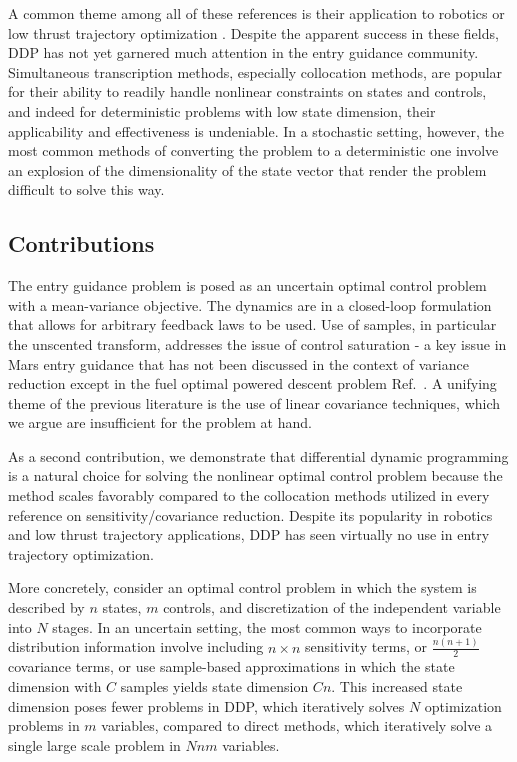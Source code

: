 \documentclass[letterpaper, paper,11pt]{AAS}
\begin{document}
A common theme among all of these references is their application to robotics \cite{iLQG, DDP_Stochastic} or low thrust trajectory optimization \cite{HDDP1,HDDP2,ozaki_UT,ozaki2020tube}. Despite the apparent success in these fields, DDP has not yet garnered much attention in the entry guidance community. Simultaneous transcription methods, especially collocation methods, are popular for their ability to readily handle nonlinear constraints on states and controls, and indeed for deterministic problems with low state dimension, their applicability and effectiveness is undeniable. In a stochastic setting, however, the most common methods of converting the problem to a deterministic one involve an explosion of the dimensionality of the state vector that render the problem difficult to solve this way.

\subsection{Contributions}
The entry guidance problem is posed as an uncertain optimal control problem with a mean-variance objective. The dynamics are in a closed-loop formulation that allows for arbitrary feedback laws to be used. Use of samples, in particular the unscented transform, addresses the issue of control saturation - a key issue in Mars entry guidance that has not been discussed in the context of variance reduction except in the fuel optimal powered descent problem Ref.~\cite{DesensitizeFuelOptimal}. A unifying theme of the previous literature is the use of linear covariance techniques, which we argue are insufficient for the problem at hand. 

As a second contribution, we demonstrate that differential dynamic programming is a natural choice for solving the nonlinear optimal control problem because the method scales favorably compared to the collocation methods utilized in every reference on sensitivity/covariance reduction. Despite its popularity in robotics and low thrust trajectory applications, DDP has seen virtually no use in entry trajectory optimization. 

More concretely, consider an optimal control problem in which the system is described by $n$ states, $m$ controls, and discretization of the independent variable into $N$ stages. In an uncertain setting, the most common ways to incorporate distribution information involve including $n\times n$ sensitivity terms, or $\frac{n(n+1)}{2}$ covariance terms, or use sample-based approximations in which the state dimension with $C$ samples yields state dimension $Cn$. This increased state dimension poses fewer problems in DDP, which iteratively solves $N$ optimization problems in $m$ variables, compared to direct methods, which iteratively solve a single large scale problem in $Nnm$ variables.
\end{document}
